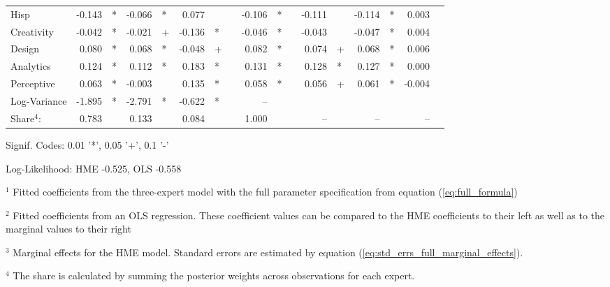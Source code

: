 \documentclass[12pt]{article}
\theoremstyle{definition}
\begin{document}
\begin{landscape}
\begin{table}
\begin{threeparttable}
\begin{tabular}[l]{l r l r l r l c r l c r l r l r l}
    Hisp                  & -0.143 & *      & -0.066 & *      &  0.077 &        && -0.106 & *     && -0.111 &          & -0.114 & *        &  0.003 &        \\
    Creativity            & -0.042 & *      & -0.021 & +      & -0.136 & *      && -0.046 & *     && -0.043 &          & -0.047 & *        &  0.004 &        \\
    Design                &  0.080 & *      &  0.068 & *      & -0.048 & +      &&  0.082 & *     &&  0.074 & +        &  0.068 & *        &  0.006 &        \\
    Analytics             &  0.124 & *      &  0.112 & *      &  0.183 & *      &&  0.131 & *     &&  0.128 & *        &  0.127 & *        &  0.000 &        \\
    Perceptive            &  0.063 & *      & -0.003 &        &  0.135 & *      &&  0.058 & *     &&  0.056 & +        &  0.061 & *        & -0.004 &        \\
    Log-Variance          & -1.895 & *      & -2.791 & *      & -0.622 & *      &&  --    &       &&  &          &  &          &  &        \\
    \cmidrule(l){2-3} \cmidrule(l){4-5} \cmidrule(l){6-7} \cmidrule(l){9-10} \cmidrule(l){12-13} \cmidrule(l){14-15} \cmidrule(l){16-17}
    Share$^{4}$:          & 0.783  &        & 0.133  &      & 0.084 &           &&  1.000 &       &&  --    &          &  --    &          &  --    &        \\
    \cmidrule{1-17}
          \end{tabular}
    
          \begin{tablenotes}
            \item Signif. Codes: 0.01 '*', 0.05 '+', 0.1 '-'
            \item Log-Likelihood: HME -0.525, OLS -0.558
            \item $^{1}$ Fitted coefficients from the three-expert model with the full parameter specification from equation (\ref{eq:full_formula})
            \item $^{2}$ Fitted coefficients from an OLS regression. These coefficient values can be compared to the HME coefficients to their left as well as to the marginal values to their right
            \item $^{3}$ Marginal effects for the HME model. Standard errors are estimated by equation (\ref{eq:std_errs_full_marginal_effects}).
            \item $^{4}$ The share is calculated by summing the posterior weights across observations for each expert.
    
          \end{tablenotes} \label{tbl:3D_full_regressions_results}
    
    
        \end{threeparttable}
    
    \end{table}
    \end{landscape}
  
\end{document}
